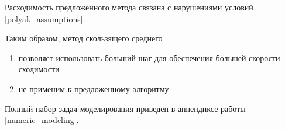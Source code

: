Расходимость предложенного метода связана с нарушениями условий \ref{polyak_assumptions}.

Таким образом, метод скользящего среднего \begin{enumerate}
    \item позволяет использовать больший шаг для обеспечения большей скорости сходимости
    \item не применим к предложенному алгоритму
\end{enumerate}

Полный набор задач моделирования приведен в аппендиксе работы \ref{numeric_modeling}.